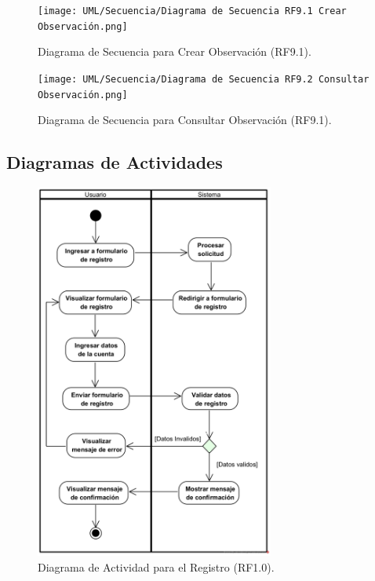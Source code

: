\begin{figure}[H]
	\centering
	\caption{Diagrama de Secuencia para Crear Observación (RF9.1).}
 \texttt{[image: UML/Secuencia/Diagrama de Secuencia RF9.1 Crear Observación.png]}
\end{figure}


\begin{figure}[H]
	\centering
	\caption{Diagrama de Secuencia para Consultar Observación (RF9.1).}
 \texttt{[image: UML/Secuencia/Diagrama de Secuencia RF9.2 Consultar Observación.png]}
\end{figure}


\subsection{Diagramas de Actividades}

\begin{figure}[H]
    \centering
    \caption{Diagrama de Actividad para el Registro (RF1.0).}
    \includegraphics[width=0.7\textwidth]{UML/Actividad/Diagrama de Actividad RF1.0 Registro.png}
\end{figure}


